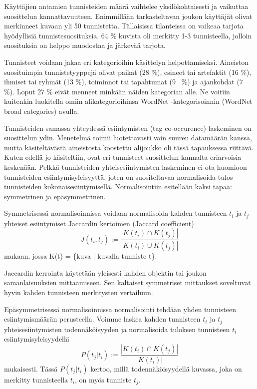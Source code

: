 \documentclass[12pt,finnish]{tktltiki2}
\theoremstyle{definition}
\theoremstyle{remark}
\begin{document}
Käyttäjien antamien tunnisteiden määrä vaihtelee yksilökohtaisesti ja vaikuttaa suosittelun kannattavuuteen. Enimmillään tarkasteltavan joukon käyttäjät olivat merkinneet kuvaan yli 50 tunnistetta. Tällaisissa tilanteissa on vaikeaa tarjota hyödyllisiä tunnistesuosituksia. 64 \% kuvista oli merkitty 1-3 tunnisteella, jolloin suosituksia on helppo muodostaa ja järkevää tarjota.

Tunnisteet voidaan jakaa eri kategorioihin käsittelyn helpottamiseksi. Aineiston suosituimpia tunnistetyyppejä olivat paikat (28 \%), esineet tai artefaktit (16 \%), ihmiset tai ryhmät (13 \%), toiminnot tai tapahtumat (9 ~\%) ja ajankohdat (7 \%). Loput 27 \% eivät menneet minkään näiden kategorian alle. Ne voitiin kuitenkin luokitella omiin alikategorioihinsa WordNet -kategorisoinnin (WordNet broad categories) avulla.

Tunnisteiden samassa yhteydessä esiintymisten (tag co-occurence) laskeminen on suosittelun ydin. Menetelmä toimii luotettavasti vain suuren datamäärän kanssa, mutta käsiteltävästä aineistosta koostettu alijoukko oli tässä tapauksessa riittävä. Kuten edellä jo käsiteltiin, ovat eri tunnisteet suosittelun kannalta eriarvoisia keskenään. Pelkkä tunnisteiden yhteisesiintymisten laskeminen ei ota huomioon tunnisteiden esiintymisyleisyyttä, joten on suositeltavaa normalisoida tulos tunnisteiden kokonaisesiintymisellä. Normalisointiin esitellään kaksi tapaa: symmetrinen ja epäsymmetrinen.

Symmetrisessä normalisoinnissa voidaan normalisoida kahden tunnisteen $t_{i}$ ja $t_{j}$ yhteiset esiintymiset Jaccardin kertoimen (Jaccard coefficient)
\begin{displaymath}
J (t_{i}, t_{j}):= \frac{|K(t_{i}) \cap K(t_{j})|} {|K(t_{i}) \cup K(t_{j})|}
\end{displaymath}
mukaan, jossa K(t) = \{kuva | kuvalla tunniste t\}.

Jaccardin kerrointa käytetään yleisesti kahden objektin tai joukon samanlaisuuksien mittaamiseen. Sen kaltaiset symmetriset mittaukset soveltuvat hyvin kahden tunnisteen merkitysten vertailuun.

Epäsymmetrisessä normalisoinnissa normalisointi tehdään yhden tunnisteen esiintymismäärän perusteella. Voimme laskea kahden tunnisteen $t_{i}$ ja $t_{j}$ yhteisesiintymisten todennäköisyyden ja normalisoida tuloksen tunnisteen $t_{i}$ esiintymisyleisyydellä 
\begin{displaymath}
P (t_{j} | t_{i}):= \frac{|K(t_{i}) \cap K(t_{j})|} {|K(t_{i})|}
\end{displaymath}
mukaisesti. Tässä $P(t_{j}|t_{i})$ kertoo, millä todennäköisyydellä kuvassa, joka on merkitty tunnisteella $t_{i}$, on myös tunniste $t_{j}$.
\end{document}

